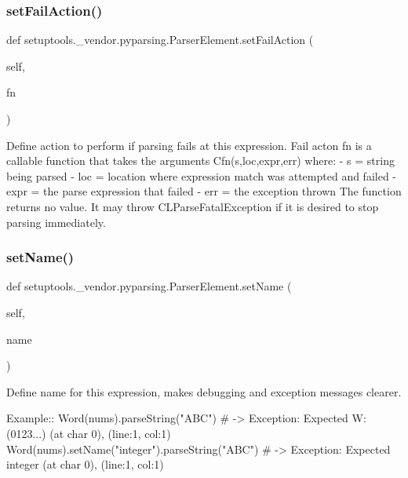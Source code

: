 \subsubsection{\texorpdfstring{set\+Fail\+Action()}{setFailAction()}}
{\footnotesize\ttfamily def setuptools.\+\_\+vendor.\+pyparsing.\+Parser\+Element.\+set\+Fail\+Action (\begin{DoxyParamCaption}\item[{}]{self,  }\item[{}]{fn }\end{DoxyParamCaption})}

\begin{DoxyVerb}Define action to perform if parsing fails at this expression.
   Fail acton fn is a callable function that takes the arguments
   C{fn(s,loc,expr,err)} where:
    - s = string being parsed
    - loc = location where expression match was attempted and failed
    - expr = the parse expression that failed
    - err = the exception thrown
   The function returns no value.  It may throw C{L{ParseFatalException}}
   if it is desired to stop parsing immediately.\end{DoxyVerb}
 \mbox{\label{classsetuptools_1_1__vendor_1_1pyparsing_1_1_parser_element_ab346e0dc4858607df91e45997f921727}} 
\subsubsection{\texorpdfstring{set\+Name()}{setName()}}
{\footnotesize\ttfamily def setuptools.\+\_\+vendor.\+pyparsing.\+Parser\+Element.\+set\+Name (\begin{DoxyParamCaption}\item[{}]{self,  }\item[{}]{name }\end{DoxyParamCaption})}

\begin{DoxyVerb}Define name for this expression, makes debugging and exception messages clearer.

Example::
    Word(nums).parseString("ABC")  # -> Exception: Expected W:(0123...) (at char 0), (line:1, col:1)
    Word(nums).setName("integer").parseString("ABC")  # -> Exception: Expected integer (at char 0), (line:1, col:1)
\end{DoxyVerb}
 \mbox{\label{classsetuptools_1_1__vendor_1_1pyparsing_1_1_parser_element_aeb240cc333ab3c73d5955f00b2dbf1e4}} 
